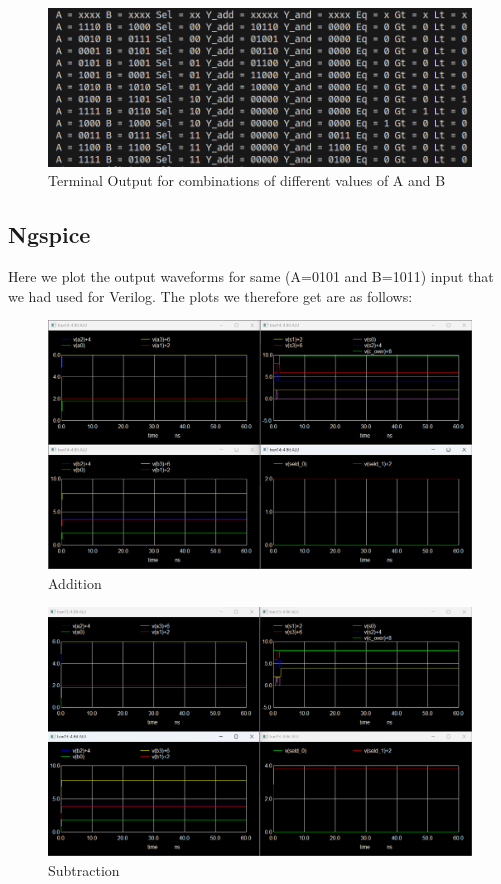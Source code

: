 \documentclass[a4paper, titlepage]{article}
\begin{document}
\begin{figure}[htp]
    \centering
    \hypertarget{VeriOut12}{\includegraphics[scale = 0.5]{Output_result_12_samples.png}}
    \caption{Terminal Output for combinations of different values of A and B}
    \label{fig:fig12}
\end{figure}

\subsection{Ngspice}
Here we plot the output waveforms for same (A=0101 and B=1011) input that we had used for Verilog. The plots we therefore get 
are as follows:
\begin{figure}[htp]
    \centering
    \hypertarget{NGA}{\includegraphics[scale = 0.3]{Adder-Subtractor_output (00-select).png}}
    \caption{Addition}
    \label{fig:fig13}
\end{figure}
\begin{figure}[htp!]
    \centering
    \hypertarget{NGS}{\includegraphics[scale = 0.3]{Adder-Subtractor_output (01-select).png}}
    \caption{Subtraction}
    \label{fig:fig14}
\end{figure}
\end{document}
